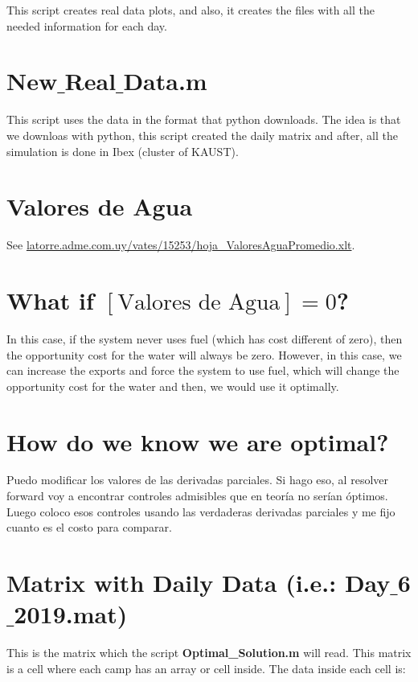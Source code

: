 \documentclass[12pt]{article}
\theoremstyle{definition}
\theoremstyle{remark}
\begin{document}
This script creates real data plots, and also, it creates the files with all the needed information for each day.

\section{New$\_$Real$\_$Data.m}

This script uses the data in the format that python downloads. The idea is that we downloas with python, this script created the daily matrix and after, all the simulation is done in Ibex (cluster of KAUST).

\section{Valores de Agua}

See \url{latorre.adme.com.uy/vates/15253/hoja_ValoresAguaPromedio.xlt}.

\section{What if $[\text{Valores de Agua}] = 0$?}

In this case, if the system never uses fuel (which has cost different of zero), then the opportunity cost for the water will always be zero. However, in this case, we can increase the exports and force the system to use fuel, which will change the opportunity cost for the water and then, we would use it optimally.

\section{How do we know we are optimal?}

Puedo modificar los valores de las derivadas parciales. Si hago eso, al resolver forward voy a encontrar controles admisibles que en teor\'ia no ser\'ian \'optimos. Luego coloco esos controles usando las verdaderas derivadas parciales y me fijo cuanto es el costo para comparar.

\section{Matrix with Daily Data (i.e.: Day$\_$6$\_$2019.mat)}

This is the matrix which the script \textbf{Optimal\_Solution.m} will read. This matrix is a cell where each camp has an array or cell inside. The data inside each cell is:
\end{document}
